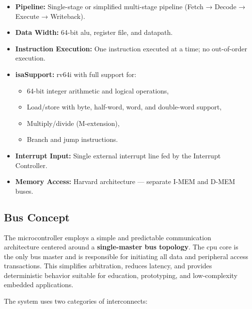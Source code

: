 \begin{itemize}
    \item \textbf{Pipeline:} Single-stage or simplified multi-stage \gls{pipeline} (Fetch → Decode → Execute → Writeback).
    \item \textbf{Data Width:} 64-bit \gls{alu}, register file, and datapath.
    \item \textbf{Instruction Execution:} One instruction executed at a time; no out-of-order execution.
    \item \textbf{\gls{isa}Support:} \gls{rv64i} with full support for:
        \begin{itemize}
            \item 64-bit integer arithmetic and logical operations,
            \item Load/store with byte, half-word, word, and double-word support,
            \item Multiply/divide (M-extension),
            \item Branch and jump instructions.
        \end{itemize}
    \item \textbf{Interrupt Input:} Single external interrupt line fed by the Interrupt Controller.
    \item \textbf{Memory Access:} \gls{Harvard} architecture — separate \gls{I-MEM} and \gls{D-MEM} buses.
\end{itemize}

\subsection{Bus Concept}
The microcontroller employs a simple and predictable communication architecture centered around a 
\textbf{single-master bus topology}. The \gls{cpu} core is the only bus master and is responsible for initiating 
all data and peripheral access transactions. This simplifies arbitration, reduces latency, and provides 
deterministic behavior suitable for education, prototyping, and low-complexity embedded applications.

The system uses two categories of interconnects:

